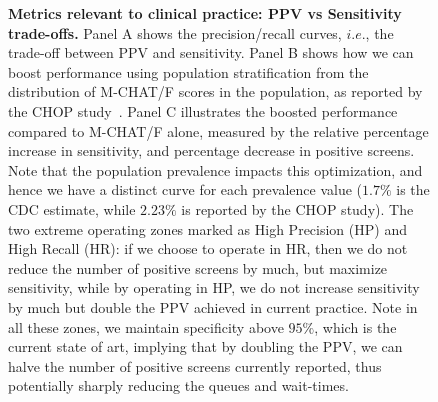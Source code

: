 \documentclass[onecolumn,,10pt]{IEEEtran}
\renewcommand{\captionN}[1]{\caption{\color{CadetBlue4!80!black} \sffamily \fontsize{9}{10}\selectfont #1  }}
\begin{document}
\begin{figure}[t]
  \tikzexternalenable
  \vspace{-10pt}

  \centering
  
  \def\AXISCOL{white}
  \def\TEXTCOL{gray}
 

 \vspace{-10pt}

 \captionN{\textbf{Metrics relevant to clinical practice: PPV vs Sensitivity trade-offs.} Panel A shows the precision/recall curves, $i.e.$,  the trade-off between PPV and sensitivity. Panel B shows how we can boost performance using population stratification from the distribution of M-CHAT/F scores in the population, as reported by the CHOP study~\cite{pmid31562252}. Panel C illustrates the boosted performance compared to M-CHAT/F alone,
   measured by the relative percentage increase in sensitivity, and percentage decrease in positive screens. Note that the population prevalence impacts this optimization, and hence  we have  a distinct  curve for each prevalence value ($1.7\%$ is the CDC estimate, while $2.23\%$ is reported by the CHOP study).  The two extreme operating zones marked as High Precision (HP) and High Recall (HR): if we choose to operate in HR, then we do not reduce the number of positive screens by much, but maximize sensitivity, while by operating in HP, we do not increase sensitivity by much but double the PPV achieved in current practice. Note in all these zones, we maintain specificity above $95\%$, which is the current state of art, implying that by doubling the PPV, we can halve the number of positive screens currently reported, thus potentially sharply reducing the queues and wait-times. }\label{figprc}
\end{figure}
\end{document}
